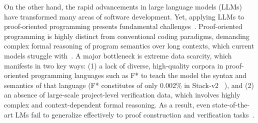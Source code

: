 On the other hand, the rapid advancements in large language models (LLMs) have transformed many areas of software development\cite{austin2021program, chen2023teaching, nijkamp2022codegen, xia2022less, xia2023automated, jin2023inferfix, jimenez2024swebenchlanguagemodelsresolve}. %
Yet, applying LLMs to proof-oriented programming presents fundamental challenges~\cite{chakraborty2024towards}. Proof-oriented programming is highly distinct from conventional coding paradigms, demanding complex formal reasoning of program semantics over long contexts, which current models struggle with~\cite{loughridge2024dafnybench}. A major bottleneck is extreme data scarcity, which manifests in two key ways: (1) a lack of diverse, high-quality corpora in proof-oriented programming languages such as F* to teach the model the syntax and semantics of that language (F* constitutes of only 0.002\% in Stack-v2 ~\cite{lozhkov2024starcoder}), and (2) an absence of large-scale project-level verification data, which involves highly complex and context-dependent formal reasoning. As a result, even state-of-the-art LMs fail to generalize effectively to proof construction and verification tasks~\cite{loughridge2024dafnybench,fstar2024}.%

